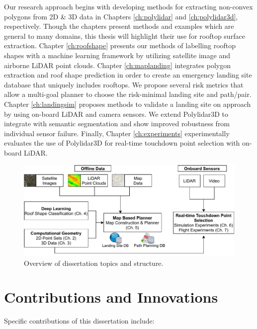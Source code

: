 Our research approach begins with developing methods for extracting non-convex polygons from 2D \& 3D data in Chapters \ref{ch:polylidar} and \ref{ch:polylidar3d}, respectively. Though the chapters present methods and examples which are general to many domains, this thesis will highlight their use for rooftop surface extraction. Chapter \ref{ch:roofshape} presents our methods of labelling rooftop shapes with a machine learning framework by utilizing satellite image and airborne LiDAR point clouds.  Chapter \ref{ch:maplanding} integrates polygon extraction and roof shape prediction in order to create an emergency landing site database that uniquely includes rooftops. We propose several risk metrics that allow a multi-goal planner to choose the risk-minimal landing site and path/pair. Chapter \ref{ch:landingsim} proposes methods to validate a landing site on approach by using on-board LiDAR and camera sensors. We extend Polylidar3D to integrate with semantic segmentation and show improved robustness from individual sensor failure. Finally, Chapter \ref{ch:experiments} experimentally evaluates the use of Polylidar3D for real-time touchdown point selection with on-board LiDAR.

\begin{figure}[t]
    \centering
    \includegraphics[width=0.80\linewidth]{chapter_1_intro/imgs/Challenge_Overview-thesis_overview.pdf}
    \caption[Overview of dissertation topics and structure]{Overview of dissertation topics and structure.}
    \label{fig:ch1_thesis_overview}
\end{figure}


\section{Contributions and Innovations}
Specific contributions of this dissertation include: %

